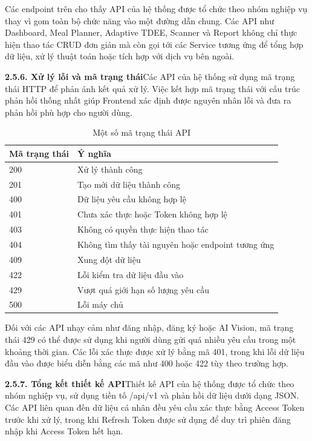 Các endpoint trên cho thấy API của hệ thống được tổ chức theo nhóm nghiệp vụ thay vì gom toàn bộ chức năng vào một đường dẫn chung. Các API như Dashboard, Meal Planner, Adaptive TDEE, Scanner và Report không chỉ thực hiện thao tác CRUD đơn giản mà còn gọi tới các Service tương ứng để tổng hợp dữ liệu, xử lý thuật toán hoặc tích hợp với dịch vụ bên ngoài.

\textbf{2.5.6. Xử lý lỗi và mã trạng thái}Các API của hệ thống sử dụng mã trạng thái HTTP để phản ánh kết quả xử lý. Việc kết hợp mã trạng thái với cấu trúc phản hồi thống nhất giúp Frontend xác định được nguyên nhân lỗi và đưa ra phản hồi phù hợp cho người dùng.

\begin{table}[H]
\centering
\caption{Một số mã trạng thái API}
\begin{tabular}{|p{4cm}|p{11cm}|}
\hline
\textbf{Mã trạng thái} & \textbf{Ý nghĩa} \\ \hline
200 & Xử lý thành công \\ \hline
201 & Tạo mới dữ liệu thành công \\ \hline
400 & Dữ liệu yêu cầu không hợp lệ \\ \hline
401 & Chưa xác thực hoặc Token không hợp lệ \\ \hline
403 & Không có quyền thực hiện thao tác \\ \hline
404 & Không tìm thấy tài nguyên hoặc endpoint tương ứng \\ \hline
409 & Xung đột dữ liệu \\ \hline
422 & Lỗi kiểm tra dữ liệu đầu vào \\ \hline
429 & Vượt quá giới hạn số lượng yêu cầu \\ \hline
500 & Lỗi máy chủ \\ \hline
\end{tabular}
\end{table}

Đối với các API nhạy cảm như đăng nhập, đăng ký hoặc AI Vision, mã trạng thái 429 có thể được sử dụng khi người dùng gửi quá nhiều yêu cầu trong một khoảng thời gian. Các lỗi xác thực được xử lý bằng mã 401, trong khi lỗi dữ liệu đầu vào được biểu diễn bằng các mã như 400 hoặc 422 tùy theo trường hợp.

\textbf{2.5.7. Tổng kết thiết kế API}Thiết kế API của hệ thống được tổ chức theo nhóm nghiệp vụ, sử dụng tiền tố /api/v1 và phản hồi dữ liệu dưới dạng JSON. Các API liên quan đến dữ liệu cá nhân đều yêu cầu xác thực bằng Access Token trước khi xử lý, trong khi Refresh Token được sử dụng để duy trì phiên đăng nhập khi Access Token hết hạn.

